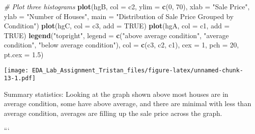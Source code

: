 \documentclass[
]{article}
\newenvironment{Shaded}{\begin{snugshade}}{\end{snugshade}}
\newcommand{\AttributeTok}[1]{\textcolor[rgb]{0.13,0.29,0.53}{#1}}
\newcommand{\CommentTok}[1]{\textcolor[rgb]{0.56,0.35,0.01}{\textit{#1}}}
\newcommand{\ConstantTok}[1]{\textcolor[rgb]{0.56,0.35,0.01}{#1}}
\newcommand{\DecValTok}[1]{\textcolor[rgb]{0.00,0.00,0.81}{#1}}
\newcommand{\FloatTok}[1]{\textcolor[rgb]{0.00,0.00,0.81}{#1}}
\newcommand{\FunctionTok}[1]{\textcolor[rgb]{0.13,0.29,0.53}{\textbf{#1}}}
\newcommand{\NormalTok}[1]{#1}
\newcommand{\StringTok}[1]{\textcolor[rgb]{0.31,0.60,0.02}{#1}}
\begin{document}
\begin{Shaded}
\begin{Highlighting}[]
\CommentTok{\# Plot three histograms}
\FunctionTok{plot}\NormalTok{(hgB, }\AttributeTok{col =}\NormalTok{ c2, }\AttributeTok{ylim =} \FunctionTok{c}\NormalTok{(}\DecValTok{0}\NormalTok{, }\DecValTok{70}\NormalTok{), }
     \AttributeTok{xlab =} \StringTok{"Sale Price"}\NormalTok{, }\AttributeTok{ylab =} \StringTok{"Number of Houses"}\NormalTok{,}
     \AttributeTok{main =} \StringTok{"Distribution of Sale Price Grouped by Condition"}\NormalTok{)}
\FunctionTok{plot}\NormalTok{(hgC, }\AttributeTok{col =}\NormalTok{ c3, }\AttributeTok{add =} \ConstantTok{TRUE}\NormalTok{)}
\FunctionTok{plot}\NormalTok{(hgA, }\AttributeTok{col =}\NormalTok{ c1, }\AttributeTok{add =} \ConstantTok{TRUE}\NormalTok{)}
\FunctionTok{legend}\NormalTok{(}\StringTok{"topright"}\NormalTok{, }
       \AttributeTok{legend =} \FunctionTok{c}\NormalTok{(}\StringTok{"above average condition"}\NormalTok{, }
                  \StringTok{"average condition"}\NormalTok{,}
                  \StringTok{"below average condition"}\NormalTok{),}
       \AttributeTok{col =} \FunctionTok{c}\NormalTok{(c3, c2, c1), }\AttributeTok{cex =} \DecValTok{1}\NormalTok{, }
       \AttributeTok{pch =} \DecValTok{20}\NormalTok{, }\AttributeTok{pt.cex =} \FloatTok{1.5}\NormalTok{)}
\end{Highlighting}
\end{Shaded}

\texttt{[image: EDA\_Lab\_Assignment\_Tristan\_files/figure-latex/unnamed-chunk-13-1.pdf]}

Summary statistics: Looking at the graph shown above most houses are in
average condition, some have above average, and there are minimal with
less than average condition, averages are filling up the sale price
across the graph.

```
\end{document}
